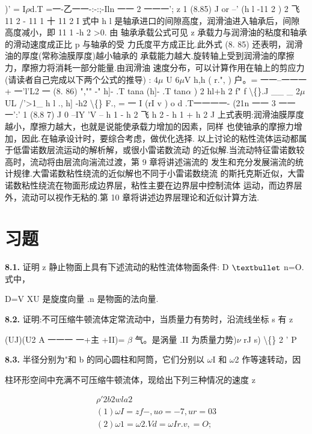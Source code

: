 )' = I$\rho$d.T =一-乙一一-:-:;-Iln 一一 2 一一一'; z 1 (8.85) J or --' (h l -11 2 ) 2 飞 11 2 - 11 1 十 11 2 I 式中 h l 是轴承进口的间隙高度，润滑油进入轴承后，间隙高度减小，即 11 1 -h 2 >0. 由 轴承承载公式可见 z 承载力与润滑油的粘度和轴承的滑动速度成正比 p 与轴承的受 力氏度平方成正比.此外式 (8. 85) 还表明，润滑油的厚度(常称油膜厚度)越小轴承的 承载能力越大.旋转轴上受到润滑油的摩擦力，摩擦力将消耗一部分能量.由润滑油 速度分布，可以计算作用在轴上的剪应力(请读者自己完成以下两个公式的推导) : 4$\mu$ U 6$\mu$V h,h ( r.", ) 户。= 一一--一一一+ 一'l'L2 一 (8. 86) ","" -" h]- .T tana (h]- .T tan$\alpha$ ) 2 hl+h 2 f" f \textbackslash\{\}.J \_\_ \_ 2$\mu$UL /'>1\_ h l ., h] -h2 \textbackslash\{\} F., = 一 I (rI v ) o d .T一一一一- (21n 一一 3 一一一':' 1 (8.8 7) J 0 --IY 'V -- h 1 - h 2 飞 h 2 - h 1 + h 2 J 上式表明:润滑油膜厚度越小，摩擦力越大，也就是说能使承载力增加的因素，同样 也使铀承的摩擦力增加，因此.在轴承设计时，要综合考虑，做优化选择. 以上讨论的粘性流体运动都属于低雷诺数层流运动的解析解，或很小雷诺数流动 的近似解.当流动特征雷诺数较高时，流动将由层流向湍流过渡，第 9 章将讲述湍流的 发生和充分发展湍流的统计规律.大雷诺数粘性绕流的近似解也不同于小雷诺数绕流 的斯托克斯近似，大雷诺数粘性绕流在物面形成边界层，粘性主要在边界层中控制流体 运动，而边界层外，流动可以视作无粘的.第 10 章将讲述边界层理论和近似计算方法.

\section*{习题}

\noindent\textbf{8.1.} 证明 z 静止物面上具有下述流动的粘性流体物面条件: D ${\rm •}$ n=O. 式中，

D=V XU 是旋度向量 .n 是物面的法向量.

\noindent\textbf{8.2.} 证明:不可压缩牛顿流体定常流动中，当质量力有势时，沿流线坐标 s 有 z

(UJ)(U2 A 一一一 一+主 +II)= $\beta$ 气。是涡量 .II 为质量力势)$\nu$ rJ s) \textbackslash\{\} 2 ' P

\noindent\textbf{8.3.} 半径分别为"和 b 的同心圆柱和阿筒，它们分别以 $\omega$I 和 $\omega$2 作等速转动，因

柱环形空间中充满不可压缩牛顿流体，现给出下列三种情况的速度 z

\begin{gather*}
\rho  '2 b2 wla 2\\
(1) \omega I=zf- ,  uo=-7 ,  ur=03\\
(2)\omega 1=\omega 2. Vd= \omega  Ir.v,  =O;
\end{gather*}

